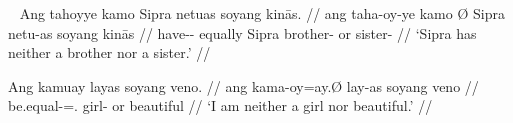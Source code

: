 \xe

\pex~\label{ex:neithernor}
\a\label{ex:neithernorvb}\begingl
	\gla Ang tahoyye kamo {} Sipra netuas soyang kinās. //
	\glb ang taha-oy-ye kamo Ø Sipra netu-as soyang kinās //
	\glc \AgtT{} have-\Neg{}-\TsgF{} equally \Top{} Sipra brother-\Parg{} 
		or sister-\Parg{} //
	\glft `Sipra has neither a brother nor a sister.' //
\endgl

\a\label{ex:neithernorpred}\begingl
	\gla Ang kamuay layas soyang veno. //
	\glb ang kama-oy=ay.Ø lay-as soyang veno //
	\glc \AgtT{} be.equal-\Neg{}=\Fsg{}.\Aarg{} girl-\Parg{} or beautiful //
	\glft `I am neither a girl nor beautiful.' //
\endgl

\xe


